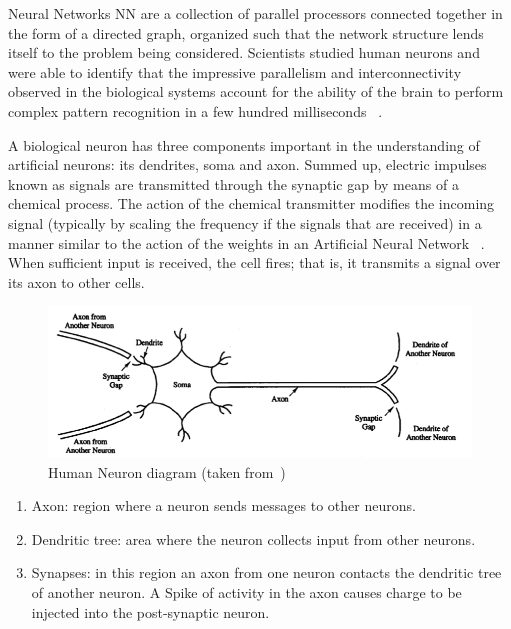 Neural Networks \ac{NN}  are a collection of parallel processors connected together in the form of a directed graph, organized such that the network structure lends itself to the problem being considered. Scientists studied human neurons and were able to identify that the impressive parallelism and interconnectivity observed in the biological systems account for the ability of the brain to perform complex pattern recognition in a few hundred milliseconds ~\cite{freeman91}.

A biological neuron has three components important in the understanding of artificial neurons: its dendrites, soma and axon. Summed up, electric impulses known as signals are transmitted through the synaptic gap by means of a chemical process. The action of the chemical transmitter modifies the incoming signal (typically by scaling the frequency if the signals that are received) in a manner similar to the action of the weights in an Artificial Neural Network ~\cite{fausett93}. When sufficient input is received, the cell fires; that is, it transmits a signal over its axon to other cells. 

\begin{figure}[htbp]
  \centering
  \includegraphics[width=\textwidth]{images/neuron}
  \caption{ Human Neuron diagram (taken from~\cite{fausett93}) }
  \label{fig:humanNeuron}
\end{figure}

\begin{enumerate}
 \item Axon:  region where a neuron sends messages to other neurons.
 \item Dendritic tree: area where the neuron collects input from other neurons.
 \item Synapses: in this region an axon from one neuron contacts the dendritic tree of another neuron. A Spike of activity in the axon causes charge to be injected into the post-synaptic neuron.
\end{enumerate}


